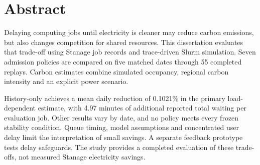 \chapter*{Abstract}
Delaying computing jobs until electricity is cleaner may reduce carbon emissions, but also changes competition for shared resources. This dissertation evaluates that trade-off using Stanage job records and trace-driven Slurm simulation. Seven admission policies are compared on five matched dates through 55 completed replays. Carbon estimates combine simulated occupancy, regional carbon intensity and an explicit power scenario.

History-only achieves a mean daily reduction of 0.1021\% in the primary load-dependent estimate, with 4.97 minutes of additional reported total waiting per evaluation job. Other results vary by date, and no policy meets every frozen stability condition. Queue timing, model assumptions and concentrated user delay limit the interpretation of small savings. A separate feedback prototype tests delay safeguards. The study provides a completed evaluation of these trade-offs, not measured Stanage electricity savings.
